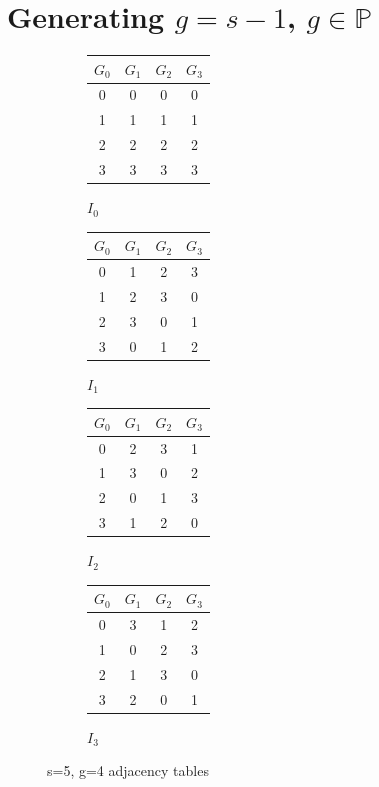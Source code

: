 \documentclass[11pt, oneside]{article} 	%
\begin{document}
\section{Generating $g = s-1$, $g \in \mathbb{P}$}
\begin{figure}[!htb]
\begin{subfigure}{.25\textwidth}
\begin{tabular}{||c c c c||} 
 \hline
$G_0$  & $G_1$ & $G_2$ & $G_3$ \\ [0.5ex] 
 \hline\hline
 0 & 0 & 0 & 0 \\ 
 \hline
 1 & 1 & 1 & 1 \\
 \hline
 2 & 2 & 2  & 2 \\
 \hline
 3 & 3  & 3 & 3 \\
 \hline
\end{tabular}
\caption{$I_0$}
\end{subfigure}
\begin{subfigure}{.25\textwidth}
\begin{tabular}{||c c c c||} 
 \hline
$G_0$  & $G_1$ & $G_2$ & $G_3$ \\ [0.5ex] 
 \hline\hline
 0 & 1 &  2 & 3 \\ 
 \hline
 \cellcolor{green} 1 & \cellcolor{green}  2 &  \cellcolor{green} 3 &  \cellcolor{green} 0 \\
 \hline
 2 & 3 & 0  & 1 \\
 \hline
 3 & 0  & 1 & 2 \\
 \hline
\end{tabular}
\caption{$I_1$}
\end{subfigure}
\begin{subfigure}{.25\textwidth}
\begin{tabular}{||c c c c||} 
 \hline
$G_0$  & $G_1$ & $G_2$ & $G_3$ \\ [0.5ex] 
 \hline\hline
 0 & 2 & 3 & 1 \\ 
 \hline
 1 & 3 & 0 & 2 \\
 \hline
 2 & 0 & 1  & 3 \\
 \hline
 3 & 1  & 2 & 0 \\
 \hline
\end{tabular}
\caption{$I_2$}
\end{subfigure}
\begin{subfigure}{.25\textwidth}
\begin{tabular}{||c c c c||} 
 \hline
$G_0$  & $G_1$ & $G_2$ & $G_3$ \\ [0.5ex] 
 \hline\hline
 0 & 3 & 1 & 2 \\ 
 \hline
 1 & 0 & 2 & 3 \\
 \hline
 2 & 1 & 3  & 0 \\
 \hline
 3 & 2  & 0 & 1 \\
 \hline
\end{tabular}
\caption{$I_3$}
\end{subfigure}
\caption{s=5, g=4 adjacency tables}
\end{figure}
\end{document}
